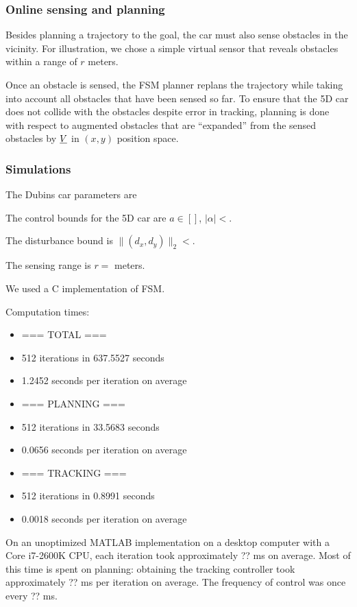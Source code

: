 
\subsubsection{Online sensing and planning}
Besides planning a trajectory to the goal, the car must also sense obstacles in the vicinity. For illustration, we chose a simple virtual sensor that reveals obstacles within a range of $r$ meters.

Once an obstacle is sensed, the FSM planner replans the trajectory while taking into account all obstacles that have been sensed so far. 
To ensure that the 5D car does not collide with the obstacles despite error in tracking, planning is done with respect to augmented obstacles that are ``expanded'' from the sensed obstacles by $\underline{V}$ in $(x,y)$ position space.


\subsubsection{Simulations}

The Dubins car parameters are

The control bounds for the 5D car are $a \in []$, $|\alpha| < $.

The disturbance bound is $\|(d_x, d_y)\|_2 < $.

The sensing range is $r = $ meters.

We used a C implementation of FSM.

Computation times:
\begin{itemize}
\item === TOTAL ===
\item  512 iterations in 637.5527 seconds
\item 1.2452 seconds per iteration on average
\item === PLANNING ===
\item 512 iterations in 33.5683 seconds
\item 0.0656 seconds per iteration on average
\item === TRACKING ===
\item 512 iterations in 0.8991 seconds
\item 0.0018 seconds per iteration on average
\end{itemize}

On an unoptimized MATLAB implementation on a desktop computer with a Core i7-2600K CPU, each iteration took approximately ?? ms on average. Most of this time is spent on planning: obtaining the tracking controller took approximately ?? ms per iteration on average. The frequency of control was once every ?? ms.

